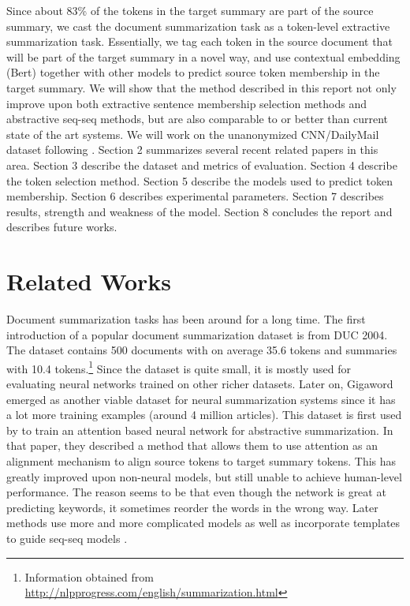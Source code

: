 \documentclass[11pt,a4paper]{article}
\begin{document}
	Since about 83\% of the tokens in the target summary are part of the source summary, we cast the document summarization task as a token-level extractive summarization task. Essentially, we tag each token in the source document that will be part of the target summary in a novel way, and use contextual embedding (Bert)\cite{bert} together with other models to predict source token membership in the target summary. We will show that the method described in this report not only improve upon both extractive sentence membership selection methods and abstractive seq-seq methods, but are also comparable to or better than current state of the art systems. We will work on the unanonymized CNN/DailyMail dataset following \citet{pointer-generator}. Section 2 summarizes several recent related papers in this area. Section 3 describe the dataset and metrics of evaluation. Section 4 describe the token selection method. Section 5 describe the models used to predict token membership. Section 6 describes experimental parameters. Section 7 describes results, strength and weakness of the model. Section 8 concludes the report and describes future works.

\section{Related Works}
Document summarization tasks has been around for a long time. The first introduction of a popular document summarization dataset is from DUC 2004. The dataset contains 500 documents with on average 35.6 tokens and summaries with 10.4 tokens.\footnote{Information obtained from \url{http://nlpprogress.com/english/summarization.html}} Since the dataset is quite small, it is mostly used for evaluating neural networks trained on other richer datasets. Later on, Gigaword emerged as another viable dataset for neural summarization systems since it has a lot more training examples (around 4 million articles). This dataset is first used by \citet{rush} to train an attention based neural network for abstractive summarization. In that paper, they described a method that allows them to use attention as an alignment mechanism to align source tokens to target summary tokens. This has greatly improved upon non-neural models, but still unable to achieve human-level performance. The reason seems to be that even though the network is great at predicting keywords, it sometimes reorder the words in the wrong way. Later methods use more and more complicated models as well as incorporate templates to guide seq-seq models \cite{rethink}. 
\end{document}
